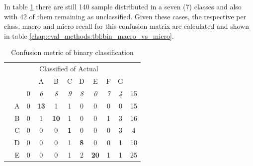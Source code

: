 In table \ref{chap:eval_methods:tbl:multi_confusion} there are still 140 sample distributed in a seven (7) classes and also with 42 of them remaining as unclassified. Given these cases, the respective per class, macro and micro recall for this confusion matrix are calculated and shown in table \ref{chap:eval_methods:tbl:bin_macro_vs_micro}.

\begin{table}[H]
	\center
	\caption{Confusion metric of binary classification}\label{chap:eval_methods:tbl:multi_confusion}
	\begin{tabular}{c c c c c c c c c c c}
		& & \multicolumn{7}{c}{Classified of Actual} & \\
		\cline{3-10}
		\multirow{9}{*}{\rotatebox[origin=c]{90}{Predicted}} & & \multicolumn{1}{|c}{\emptyset} & \multicolumn{1}{c}{A} & \multicolumn{1}{c}{B} & \multicolumn{1}{c}{C} & \multicolumn{1}{c}{D} & \multicolumn{1}{c}{E}  & \multicolumn{1}{c}{F} & \multicolumn{1}{c|}{G} & \\
		\cline{2-10}
		& \multicolumn{1}{|c}{\emptyset} & \multicolumn{1}{|c}{0} & \multicolumn{1}{c}{\textit{6}} & \multicolumn{1}{c}{\textit{8}} & \multicolumn{1}{c}{\textit{9}} & \multicolumn{1}{c}{\textit{8}} & \multicolumn{1}{c}{\textit{0}} & \multicolumn{1}{c}{\textit{7}} & \multicolumn{1}{c|}{\textit{4}} & 15 \\
		& \multicolumn{1}{|c}{A} & \multicolumn{1}{|c}{0} & \multicolumn{1}{c}{\textbf{13}} & \multicolumn{1}{c}{1} & \multicolumn{1}{c}{1} & \multicolumn{1}{c}{0} & \multicolumn{1}{c}{0} & \multicolumn{1}{c}{0} & \multicolumn{1}{c|}{0} & 15 \\
		& \multicolumn{1}{|c}{B} & \multicolumn{1}{|c}{0} & \multicolumn{1}{c}{1} & \multicolumn{1}{c}{\textbf{10}} & \multicolumn{1}{c}{1} & \multicolumn{1}{c}{0} & \multicolumn{1}{c}{0} & \multicolumn{1}{c}{1} & \multicolumn{1}{c|}{3} & 16 \\
		& \multicolumn{1}{|c}{C} & \multicolumn{1}{|c}{0} & \multicolumn{1}{c}{0} & \multicolumn{1}{c}{0} & \multicolumn{1}{c}{\textbf{1}} & \multicolumn{1}{c}{0} & \multicolumn{1}{c}{0} & \multicolumn{1}{c}{0} & \multicolumn{1}{c|}{3} & 4 \\
		& \multicolumn{1}{|c}{D} & \multicolumn{1}{|c}{0} & \multicolumn{1}{c}{0} & \multicolumn{1}{c}{0} & \multicolumn{1}{c}{1} & \multicolumn{1}{c}{\textbf{8}} & \multicolumn{1}{c}{0} & \multicolumn{1}{c}{0} & \multicolumn{1}{c|}{1} & 10 \\
		& \multicolumn{1}{|c}{E} & \multicolumn{1}{|c}{0} & \multicolumn{1}{c}{0} & \multicolumn{1}{c}{0} & \multicolumn{1}{c}{1} & \multicolumn{1}{c}{2} & \multicolumn{1}{c}{\textbf{20}} & \multicolumn{1}{c}{1} & \multicolumn{1}{c|}{1} & 25 \\

\end{tabular}
\end{table}
